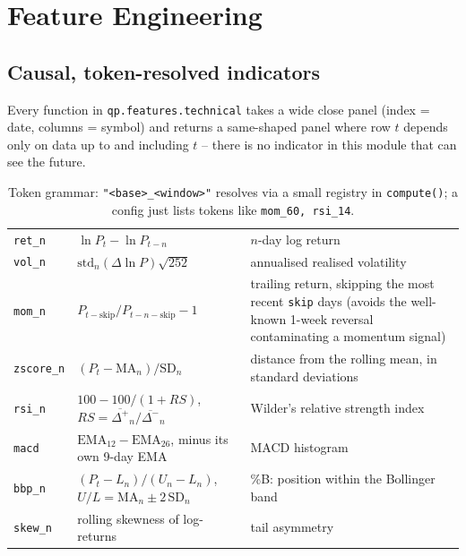 \chapter{Feature Engineering}

\section{Causal, token-resolved indicators}

Every function in \texttt{qp.features.technical} takes a wide close panel
(index = date, columns = symbol) and returns a same-shaped panel where row $t$
depends only on data up to and including $t$ -- there is no indicator in this
module that can see the future.

\begin{table}[h]
\footnotesize
\centering
\begin{tabularx}{\textwidth}{L{2.2cm} L{2.6cm} X}
\toprule
{} &  &  \\
\midrule
\texttt{ret\_n} & $\ln P_t - \ln P_{t-n}$ & $n$-day log return \\
\texttt{vol\_n} & $\mathrm{std}_n(\Delta \ln P)\sqrt{252}$ & annualised realised volatility \\
\texttt{mom\_n} & $P_{t-\text{skip}}/P_{t-n-\text{skip}} - 1$ & trailing return, skipping the most recent \texttt{skip} days (avoids the well-known 1-week reversal contaminating a momentum signal) \\
\texttt{zscore\_n} & $(P_t - \mathrm{MA}_n)/\mathrm{SD}_n$ & distance from the rolling mean, in standard deviations \\
\texttt{rsi\_n} & $100 - 100/(1+RS)$, $RS = \overline{\Delta^+}_n / \overline{\Delta^-}_n$ & Wilder's relative strength index \\
\texttt{macd} & $\mathrm{EMA}_{12} - \mathrm{EMA}_{26}$, minus its own 9-day EMA & MACD histogram \\
\texttt{bbp\_n} & $(P_t - L_n)/(U_n - L_n)$, $U/L = \mathrm{MA}_n \pm 2\,\mathrm{SD}_n$ & \%B: position within the Bollinger band \\
\texttt{skew\_n} & rolling skewness of log-returns & tail asymmetry \\
\bottomrule
\end{tabularx}
\caption{Token grammar: \texttt{"<base>\_<window>"} resolves via a small registry
in \texttt{compute()}; a config just lists tokens like \texttt{mom\_60, rsi\_14}.}
\end{table}

